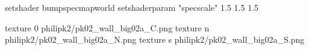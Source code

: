 setshader bumpspecmapworld
setshaderparam "specscale" 1.5 1.5 1.5

texture 0 philipk2/pk02_wall_big02a_C.png
texture n philipk2/pk02_wall_big02a_N.png
texture s philipk2/pk02_wall_big02a_S.png

